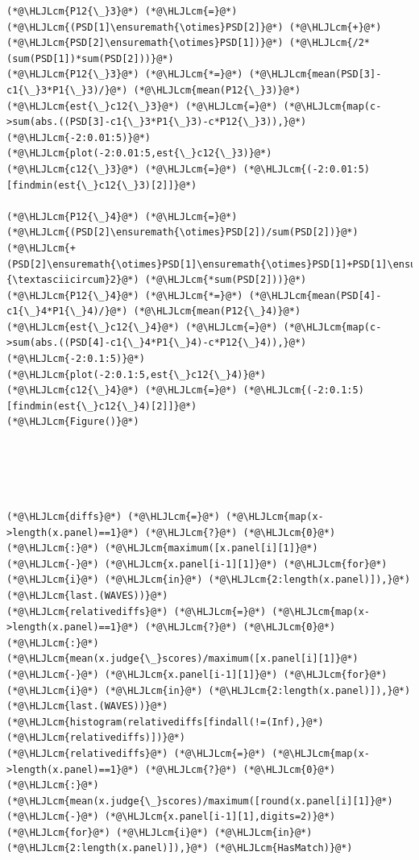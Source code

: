 \documentclass[12pt,a4paper]{article}
\newcommand{\HLJLcm}[1]{\textcolor[RGB]{153,153,119}{\textit{#1}}}
\begin{document}
\begin{lstlisting}
(*@\HLJLcm{P12{\_}3}@*) (*@\HLJLcm{=}@*) (*@\HLJLcm{(PSD[1]\ensuremath{\otimes}PSD[2]}@*) (*@\HLJLcm{+}@*) (*@\HLJLcm{PSD[2]\ensuremath{\otimes}PSD[1])}@*) (*@\HLJLcm{/2*(sum(PSD[1])*sum(PSD[2]))}@*)
(*@\HLJLcm{P12{\_}3}@*) (*@\HLJLcm{*=}@*) (*@\HLJLcm{mean(PSD[3]-c1{\_}3*P1{\_}3)/}@*) (*@\HLJLcm{mean(P12{\_}3)}@*)
(*@\HLJLcm{est{\_}c12{\_}3}@*) (*@\HLJLcm{=}@*) (*@\HLJLcm{map(c->sum(abs.((PSD[3]-c1{\_}3*P1{\_}3)-c*P12{\_}3)),}@*) (*@\HLJLcm{-2:0.01:5)}@*)
(*@\HLJLcm{plot(-2:0.01:5,est{\_}c12{\_}3)}@*)
(*@\HLJLcm{c12{\_}3}@*) (*@\HLJLcm{=}@*) (*@\HLJLcm{(-2:0.01:5)[findmin(est{\_}c12{\_}3)[2]]}@*)

(*@\HLJLcm{P12{\_}4}@*) (*@\HLJLcm{=}@*) (*@\HLJLcm{(PSD[2]\ensuremath{\otimes}PSD[2])/sum(PSD[2])}@*) (*@\HLJLcm{+(PSD[2]\ensuremath{\otimes}PSD[1]\ensuremath{\otimes}PSD[1]+PSD[1]\ensuremath{\otimes}PSD[2]\ensuremath{\otimes}PSD[1]+PSD[1]\ensuremath{\otimes}PSD[1]\ensuremath{\otimes}PSD[2])/(3*sum(PSD[1]){\textasciicircum}2}@*) (*@\HLJLcm{*sum(PSD[2]))}@*)
(*@\HLJLcm{P12{\_}4}@*) (*@\HLJLcm{*=}@*) (*@\HLJLcm{mean(PSD[4]-c1{\_}4*P1{\_}4)/}@*) (*@\HLJLcm{mean(P12{\_}4)}@*)
(*@\HLJLcm{est{\_}c12{\_}4}@*) (*@\HLJLcm{=}@*) (*@\HLJLcm{map(c->sum(abs.((PSD[4]-c1{\_}4*P1{\_}4)-c*P12{\_}4)),}@*) (*@\HLJLcm{-2:0.1:5)}@*)
(*@\HLJLcm{plot(-2:0.1:5,est{\_}c12{\_}4)}@*)
(*@\HLJLcm{c12{\_}4}@*) (*@\HLJLcm{=}@*) (*@\HLJLcm{(-2:0.1:5)[findmin(est{\_}c12{\_}4)[2]]}@*)
(*@\HLJLcm{Figure()}@*)





(*@\HLJLcm{diffs}@*) (*@\HLJLcm{=}@*) (*@\HLJLcm{map(x->length(x.panel)==1}@*) (*@\HLJLcm{?}@*) (*@\HLJLcm{0}@*) (*@\HLJLcm{:}@*) (*@\HLJLcm{maximum([x.panel[i][1]}@*) (*@\HLJLcm{-}@*) (*@\HLJLcm{x.panel[i-1][1]}@*) (*@\HLJLcm{for}@*) (*@\HLJLcm{i}@*) (*@\HLJLcm{in}@*) (*@\HLJLcm{2:length(x.panel)]),}@*) (*@\HLJLcm{last.(WAVES))}@*)
(*@\HLJLcm{relativediffs}@*) (*@\HLJLcm{=}@*) (*@\HLJLcm{map(x->length(x.panel)==1}@*) (*@\HLJLcm{?}@*) (*@\HLJLcm{0}@*) (*@\HLJLcm{:}@*) (*@\HLJLcm{mean(x.judge{\_}scores)/maximum([x.panel[i][1]}@*) (*@\HLJLcm{-}@*) (*@\HLJLcm{x.panel[i-1][1]}@*) (*@\HLJLcm{for}@*) (*@\HLJLcm{i}@*) (*@\HLJLcm{in}@*) (*@\HLJLcm{2:length(x.panel)]),}@*) (*@\HLJLcm{last.(WAVES))}@*)
(*@\HLJLcm{histogram(relativediffs[findall(!=(Inf),}@*) (*@\HLJLcm{relativediffs)])}@*)
(*@\HLJLcm{relativediffs}@*) (*@\HLJLcm{=}@*) (*@\HLJLcm{map(x->length(x.panel)==1}@*) (*@\HLJLcm{?}@*) (*@\HLJLcm{0}@*) (*@\HLJLcm{:}@*) (*@\HLJLcm{mean(x.judge{\_}scores)/maximum([round(x.panel[i][1]}@*) (*@\HLJLcm{-}@*) (*@\HLJLcm{x.panel[i-1][1],digits=2)}@*) (*@\HLJLcm{for}@*) (*@\HLJLcm{i}@*) (*@\HLJLcm{in}@*) (*@\HLJLcm{2:length(x.panel)]),}@*) (*@\HLJLcm{HasMatch)}@*)


\end{lstlisting}
\end{document}
